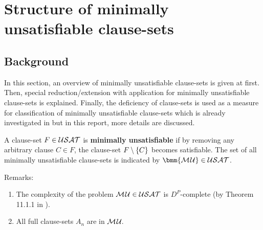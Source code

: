 \documentclass{report}
\begin{document}
\chapter{Structure of minimally unsatisfiable clause-sets}
\label{cha:mucls}

\section{Background}
\label{sec:basicdef}

In this section, an overview of minimally unsatisfiable clause-sets is given at first. Then, special reduction/extension with application for minimally unsatisfiable clause-sets is explained. Finally, the deficiency of clause-sets is used as a measure for classification of minimally unsatisfiable clause-sets which is already investigated in \cite{KullmannZhao2010Extremal, Kullmann2007HandbuchMU, KullmannZhao2016UHitSAT, KleineBuening2000SubclassesMU, Ku99dK} but in this report, more details are discussed.

\begin{defi}\label{def:mu}
A clause-set $F \in \mathcal{USAT}$ is \textbf{minimally unsatisfiable} if by removing any arbitrary clause $C \in F$, the clause-set $F \setminus \{ C \}$ becomes satisfiable. The set of all minimally unsatisfiable clause-sets is indicated by $\bmm{\Musat} \in \Usat$.
\end{defi}
Remarks:
  \begin{enumerate}
  \item The complexity of the problem $\mathcal{M\hspace{0.8pt}U} \in \mathcal{USAT}$ is $D^P$-complete (by Theorem 11.1.1 in \cite{Kullmann2007HandbuchMU}).
  \item All full clause-sets $ A_n$ are in $\mathcal{M\hspace{0.8pt}U}_{\!}$.
  \end{enumerate}
\end{document}
